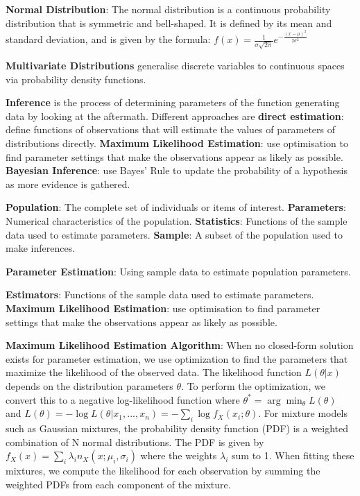 \documentclass{article}
\begin{document}

\textbf{Normal Distribution}:
The normal distribution is a continuous probability distribution that is symmetric and bell-shaped.
It is defined by its mean and standard deviation, and is given by the formula:
$ f(x) = \frac{1}{\sigma \sqrt{2\pi}} e^{-\frac{(x-\mu)^2}{2\sigma^2}} $



\textbf{Multivariate Distributions} generalise discrete variables to continuous spaces via probability density functions.


\textbf{Inference} is the process of determining parameters of the function generating data by looking at the aftermath.
Different approaches are \textbf{direct estimation}: define functions of observations that will estimate the values of parameters
of distributions directly.
\textbf{Maximum Likelihood Estimation}: use optimisation to find parameter settings that make the observations appear as likely as possible.
\textbf{Bayesian Inference}: use Bayes' Rule to update the probability of a hypothesis as more evidence is gathered.


\textbf{Population}: The complete set of individuals or items of interest.
\textbf{Parameters}: Numerical characteristics of the population.
\textbf{Statistics}: Functions of the sample data used to estimate parameters.
\textbf{Sample}: A subset of the population used to make inferences.


\textbf{Parameter Estimation}: Using sample data to estimate population parameters.


\textbf{Estimators}: Functions of the sample data used to estimate parameters.
\textbf{Maximum Likelihood Estimation}: use optimisation to find parameter settings that make the observations appear as likely as possible.


\textbf{Maximum Likelihood Estimation Algorithm}:
When no closed-form solution exists for parameter estimation, we use optimization to find the parameters that maximize the likelihood of the observed data.
The likelihood function $L(\theta|x)$ depends on the distribution parameters $\theta$.
To perform the optimization, we convert this to a negative log-likelihood function where $\theta^* = \arg \min_\theta L(\theta)$ and $L(\theta) = -\log L(\theta|x_1,...,x_n) = -\sum_i \log f_X(x_i;\theta)$.
For mixture models such as Gaussian mixtures, the probability density function (PDF) is a weighted combination of N normal distributions.
The PDF is given by $f_X(x) = \sum_i \lambda_i n_X(x;\mu_i,\sigma_i)$ where the weights $\lambda_i$ sum to 1.
When fitting these mixtures, we compute the likelihood for each observation by summing the weighted PDFs from each component of the mixture.
\end{document}

